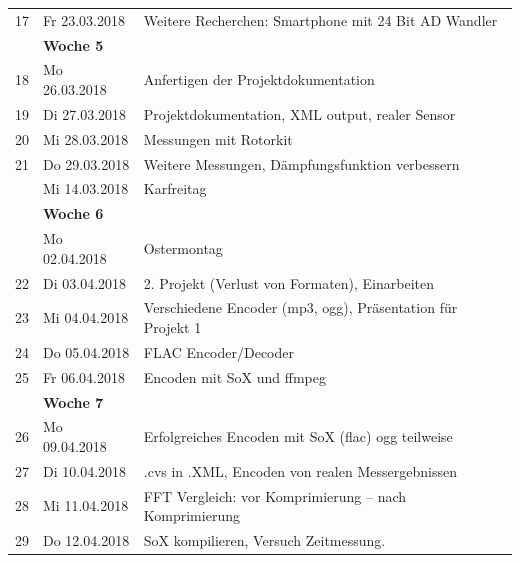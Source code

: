 \documentclass{article}
\begin{document}
{\begin{tabular}{l|p{2.5cm}|p{15cm}}
		 17 & Fr 23.03.2018 & 
		 Weitere Recherchen: Smartphone mit 24 Bit AD Wandler\\


		& \textbf{Woche 5}&\\

		
		
		18 & Mo 26.03.2018 & 
			Anfertigen der Projektdokumentation\\

		19 & Di 27.03.2018	 & 
		Projektdokumentation, XML output, realer Sensor\\

		20 & Mi 28.03.2018 & 
			Messungen mit Rotorkit\\

		21 & Do 29.03.2018 & 
			Weitere Messungen, Dämpfungsfunktion verbessern\\

		 & Mi 14.03.2018 & 
			Karfreitag\\

		

		& \textbf{Woche 6}&\\

		
		
		& Mo 02.04.2018  & 
		Ostermontag\\

		22 & Di 03.04.2018	 & 
		2. Projekt (Verlust von Formaten), Einarbeiten\\

		23 & Mi 04.04.2018	 & 
		Verschiedene Encoder (mp3, ogg), Präsentation für Projekt 1\\

		24 & Do 05.04.2018 & 
		FLAC Encoder/Decoder\\

		25 & Fr 06.04.2018 & 
		Encoden mit SoX und ffmpeg\\

		& \textbf{Woche 7}&\\

		
		
		26 & Mo 09.04.2018  & 
		Erfolgreiches Encoden mit SoX (flac) ogg teilweise\\

		27 & Di 10.04.2018  & 
		.cvs in .XML, Encoden von realen Messergebnissen\\

		28 & Mi 11.04.2018		 & 
		FFT Vergleich: vor Komprimierung – nach Komprimierung \\

		29 & Do 12.04.2018 & 
		SoX kompilieren, Versuch Zeitmessung.\\


\end{tabular}}
\end{document}
